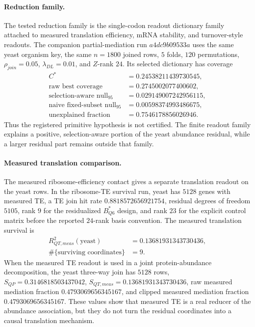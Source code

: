 \paragraph{Reduction family.}
The tested reduction family is the single-codon readout dictionary family attached to measured translation efficiency, mRNA stability, and turnover-style readouts.  The companion partial-mediation run $a4dc9b09533a$ uses the same yeast organism key, the same $n=1800$ joined rows, $5$ folds, $120$ permutations, $\rho_{join}=0.05$, $\lambda_{DL}=0.01$, and $Z$-rank $24$.  Its selected dictionary has coverage
$$
\begin{aligned}
C^{\ast} &= 0.24538211439730545,\\
\text{raw best coverage} &= 0.2745002077400602,\\
\text{selection-aware null}_{95} &= 0.029149007242956115,\\
\text{naive fixed-subset null}_{95} &= 0.00598374993486675,\\
\text{unexplained fraction} &= 0.7546178856026946.
\end{aligned}
$$
Thus the registered primitive hypothesis is not certified.  The finite readout family explains a positive, selection-aware portion of the yeast abundance residual, while a larger residual part remains outside that family.

\paragraph{Measured translation comparison.}
The measured ribosome-efficiency contact gives a separate translation readout on the yeast rows.  In the ribosome-TE survival run, yeast has $5128$ genes with measured TE, a TE join hit rate $0.8818572656921754$, residual degrees of freedom $5105$, rank $9$ for the residualized $B^{\ast}_{Q6}$ design, and rank $23$ for the explicit control matrix before the reported $24$-rank basis convention.  The measured translation survival is
$$
\begin{aligned}
R^2_{QT,meas}(\text{yeast}) &= 0.13681931343730436,\\
\#\{\text{surviving coordinates}\} &= 9.
\end{aligned}
$$
When the measured TE readout is used in a joint protein-abundance decomposition, the yeast three-way join has $5128$ rows, $S_{QP}=0.3146818503437042$, $S_{QT,meas}=0.13681931343730436$, raw measured mediation fraction $0.4793069656345167$, and clipped measured mediation fraction $0.4793069656345167$.  These values show that measured TE is a real reducer of the abundance association, but they do not turn the residual coordinates into a causal translation mechanism.

